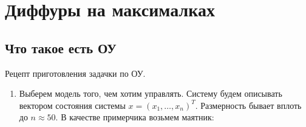 \documentclass[../main.tex]{subfiles}
\begin{document}
\section{Диффуры на максималках}

\subsection{Что такое есть ОУ}

Рецепт приготовления задачки по ОУ.

\begin{enumerate}[I]
    \item Выберем модель того, чем хотим управлять.
        Систему будем описывать вектором состояния системы
        $x = (x_1, \ldots, x_n)^T$.
        Размерность бывает вплоть до $n \approx 50$.
        В качестве примерчика возьмем маятник:



\end{enumerate} 
\end{document}
